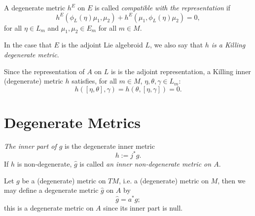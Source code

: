 \begin{definition}
A degenerate metric $h^E$ on $E$ is called \emph{compatible with the representation} if
\begin{equation*}
    h^E(\phi_L(\eta) \mu_1, \mu_2) + h^E(\mu_1, \phi_L(\eta)\mu_2) = 0,
\end{equation*}
for all $\eta \in L_m$ and $\mu_1, \mu_2 \in E_m$ for all $m \in M$.

In the case that $E$ is the adjoint Lie algebroid $L$, we also say that \emph{$h$ is a Killing degenerate metric}.
\end{definition}

Since the representation of $A$ on $L$ is is the adjoint representation, a Killing inner (degenerate) metric $h$ satisfies, for all $m \in M$, $\eta, \theta, \gamma \in L_m$:
\begin{equation}
    h([\eta, \theta], \gamma) = h(\theta, [\eta, \gamma]) = 0.
\end{equation}

\section{Degenerate Metrics}

\begin{definition}
\emph{The inner part of $\hat g$} is the degenerate inner metric \begin{equation}
    h := j^*g.
\end{equation} If $h$ is non-degenerate, $\hat g$ is called \emph{an inner non-degenerate metric on $A$}.
\end{definition}

Let $g$ be a (degenerate) metric on $TM$, i.e. a (degenerate) metric on $M$, then we may define a degenerate metric $\hat g$ on $A$ by
\begin{equation}
    \hat g = a^* g;
\end{equation}
this is a degenerate metric on $A$ since its inner part is null.

